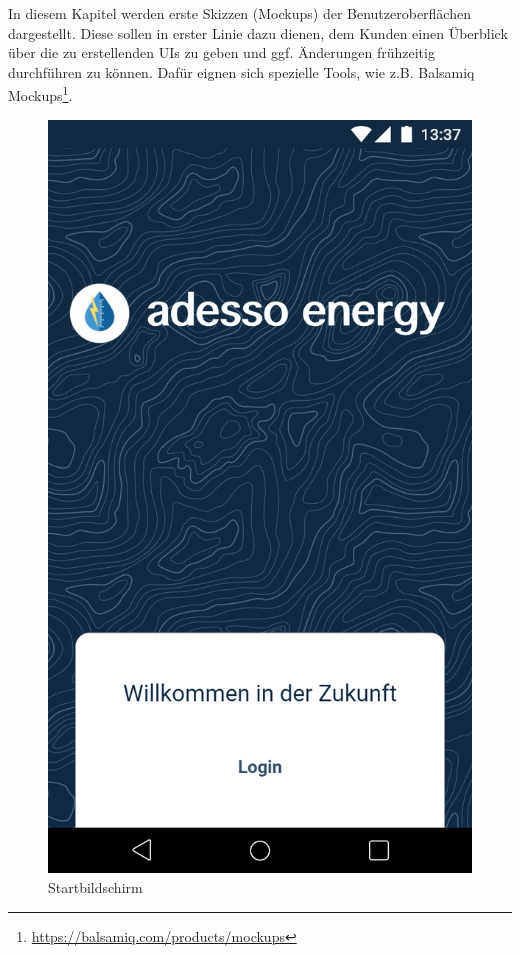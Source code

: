 \begin{tcolorbox}
In diesem Kapitel werden erste Skizzen (Mockups) der Benutzeroberflächen dargestellt.
Diese sollen in erster Linie dazu dienen, dem Kunden einen Überblick über die zu erstellenden UIs zu geben und ggf. Änderungen frühzeitig durchführen zu können.
Dafür eignen sich spezielle Tools, wie z.B. Balsamiq Mockups\footnote{\url{https://balsamiq.com/products/mockups}}.
\end{tcolorbox}
\begin{figure}[h]
	\includegraphics[scale = 0.22]{img/AndroidMockup/splash}	
	\caption{Startbildschirm}
	\label{fig:mock-start}

\end{figure}

